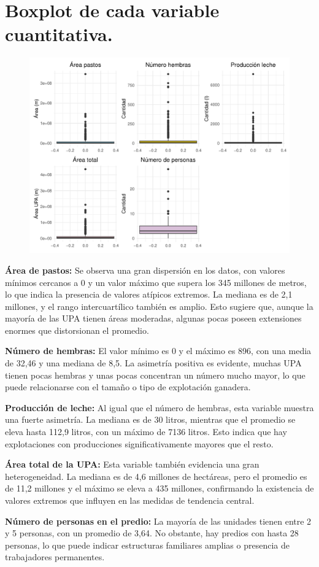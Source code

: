\documentclass[]{tufte-handout}
\begin{document}
\section{Boxplot de cada variable
cuantitativa.}\label{boxplot-de-cada-variable-cuantitativa.}

\begin{figure}
\includegraphics{Informe_files/figure-latex/caja-1} \end{figure}
\begin{justify}
\textbf{Área de pastos:} Se observa una gran dispersión en los datos, con valores mínimos cercanos a 0 y un valor máximo que supera los 345 millones de metros, lo que indica la presencia de valores atípicos extremos. La mediana es de 2,1 millones, y el rango intercuartílico también es amplio. Esto sugiere que, aunque la mayoría de las UPA tienen áreas moderadas, algunas pocas poseen extensiones enormes que distorsionan el promedio.

\textbf{Número de hembras:} El valor mínimo es 0 y el máximo es 896, con una media de 32,46 y una mediana de 8,5. La asimetría positiva es evidente, muchas UPA tienen pocas hembras y unas pocas concentran un número mucho mayor, lo que puede relacionarse con el tamaño o tipo de explotación ganadera.

\textbf{Producción de leche:} Al igual que el número de hembras, esta variable muestra una fuerte asimetría. La mediana es de 30 litros, mientras que el promedio se eleva hasta 112,9 litros, con un máximo de 7136 litros. Esto indica que hay explotaciones con producciones significativamente mayores que el resto.

\textbf{Área total de la UPA:} Esta variable también evidencia una gran heterogeneidad. La mediana es de 4,6 millones de hectáreas, pero el promedio es de 11,2 millones y el máximo se eleva a 435 millones, confirmando la existencia de valores extremos que influyen en las medidas de tendencia central.

\textbf{Número de personas en el predio:} La mayoría de las unidades tienen entre 2 y 5 personas, con un promedio de 3,64. No obstante, hay predios con hasta 28 personas, lo que puede indicar estructuras familiares amplias o presencia de trabajadores permanentes.

\end{justify}
\end{document}
